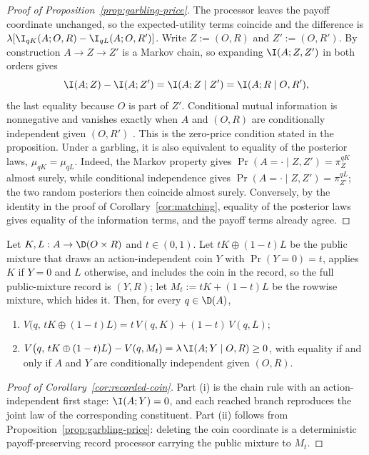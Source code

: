\begin{proof}[Proof of Proposition~\ref{prop:garbling-price}]
The processor leaves the payoff coordinate unchanged, so the expected-utility terms coincide and the difference is
$\lambda[\I_{qK}(A;O,R)-\I_{qL}(A;O,R')]$.  Write $Z:=(O,R)$ and $Z':=(O,R')$.  By construction $A\to Z\to Z'$ is
a Markov chain, so expanding $\I(A;Z,Z')$ in both orders gives
\[
 \I(A;Z)-\I(A;Z')=\I(A;Z\mid Z')=\I(A;R\mid O,R'),
\]
the last equality because $O$ is part of $Z'$.  Conditional mutual information is nonnegative and vanishes exactly
when $A$ and $(O,R)$ are conditionally independent given $(O,R')$ \cite{CoverThomas2006}.  This is the zero-price
condition stated in the proposition.  Under a garbling, it is also equivalent to equality of the posterior laws,
$\mu_{qK}=\mu_{qL}$.  Indeed, the Markov property gives
$\Pr(A=\cdot\mid Z,Z')=\pi^{qK}_{Z}$ almost surely, while conditional independence gives
$\Pr(A=\cdot\mid Z,Z')=\pi^{qL}_{Z'}$; the two random posteriors then coincide almost surely.  Conversely, by the
identity in the proof of Corollary~\ref{cor:matching}, equality of the posterior laws gives equality of the
information terms, and the payoff terms already agree.
\end{proof}

\begin{corollary}\label{cor:recorded-coin}
Let $K,L:A\to\D(O\times R)$ and $t\in(0,1)$.  Let $tK\oplus(1-t)L$ be the public mixture that draws an
action-independent coin $Y$ with $\Pr(Y=0)=t$, applies $K$ if $Y=0$ and $L$ otherwise, and includes the coin in
the record, so the full public-mixture record is $(Y,R)$; let $M_t:=tK+(1-t)L$ be the rowwise mixture, which hides it.  Then, for every $q\in\D(A)$,
\begin{enumerate}[label=\textup{(\roman*)},leftmargin=*]
\item $V\bigl(q,\,tK\oplus(1-t)L\bigr)=t\,V(q,K)+(1-t)\,V(q,L)$;
\item $V\bigl(q,\,tK\oplus(1-t)L\bigr)-V(q,M_t)=\lambda\,\I(A;Y\mid O,R)\ge0$, with equality if and only if $A$
and $Y$ are conditionally independent given $(O,R)$.
\end{enumerate}
\end{corollary}

\begin{proof}[Proof of Corollary~\ref{cor:recorded-coin}]
Part \textup{(i)} is the chain rule with an action-independent first stage:
$\I(A;Y)=0$, and each reached branch reproduces the joint law of the
corresponding constituent.  Part \textup{(ii)} follows from
Proposition~\ref{prop:garbling-price}: deleting the coin coordinate is a
deterministic payoff-preserving record processor carrying the public mixture
to $M_t$.
\end{proof}

